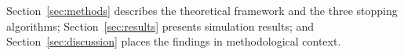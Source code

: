 Section~\ref{sec:methods} describes the theoretical framework and the three stopping
algorithms; Section~\ref{sec:results} presents simulation results; and
Section~\ref{sec:discussion} places the findings in methodological context.
